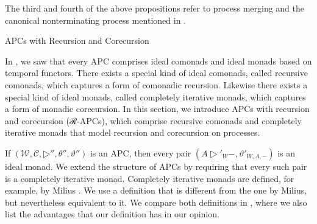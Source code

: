 \documentclass[copyright,creativecommons]{eptcs}
\begin{document}
The third and fourth of the above propositions refer to process merging and the
canonical nonterminating process mentioned in
.

           {APCs with Recursion and Corecursion}

In , we saw that every APC
comprises ideal comonads and ideal monads based on temporal functors. There
exists a special kind of ideal comonads, called recursive comonads, which
captures a form of comonadic recursion. Likewise there exists a special kind of
ideal monads, called completely iterative monads, which captures a form of
monadic corecursion. In this section, we introduce APCs with recursion and
corecursion (ℛ-APCs), which comprise recursive comonads and completely iterative
monads that model recursion and corecursion on processes.


If $(𝒲, 𝒞, ▷″, θ″, ϑ″)$ is an APC, then every pair $\left(A ▷′_W {-}, ϑ′_{W, A,
{-}}\right)$ is an ideal monad. We extend the structure of APCs by requiring
that every such pair is a completely iterative monad. Completely iterative
monads are defined, for example, by Milius
\cite[Definition~5.5]{milius:ic-196-1}. We use a definition that is different
from the one by Milius, but nevertheless equivalent to it. We compare both
definitions in
, where we
also list the advantages that our definition has in our opinion.
\end{document}
